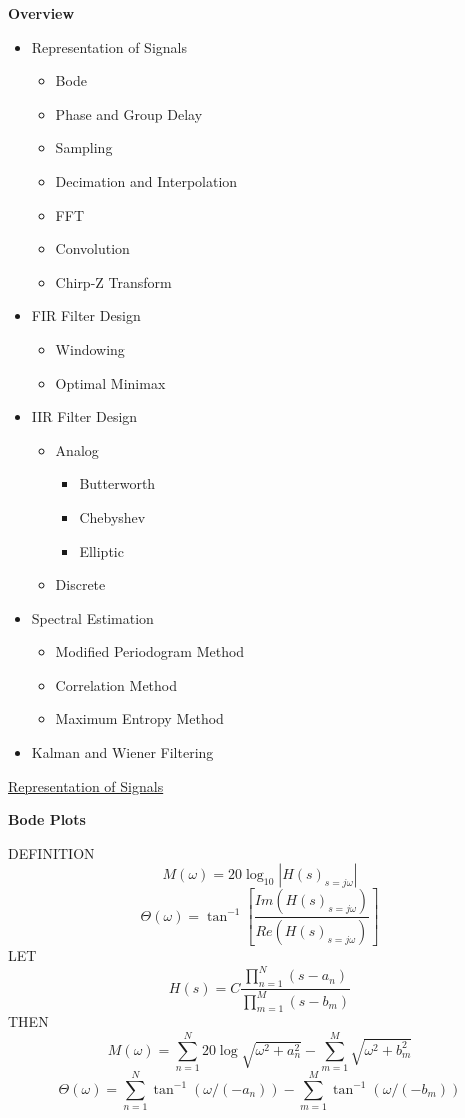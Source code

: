 \begin{slide}
{}
\begin{center}
{\bf Overview}
\end{center}
{\tiny
\begin{itemize}
\item Representation of Signals
   \begin{itemize}
   \item Bode
   \item Phase and Group Delay
   \item Sampling
   \item Decimation and Interpolation
   \item FFT
   \item Convolution
   \item Chirp-Z Transform
   \end{itemize}
\item FIR Filter Design
   \begin{itemize}
   \item Windowing
   \item Optimal Minimax
   \end{itemize}
\item IIR Filter Design
   \begin{itemize}
   \item Analog
      \begin{itemize}
      \item Butterworth
      \item Chebyshev
      \item Elliptic
      \end{itemize}
   \item Discrete
   \end{itemize}
\item Spectral Estimation
   \begin{itemize}
   \item Modified Periodogram Method
   \item Correlation Method
   \item Maximum Entropy Method
   \end{itemize}
\item Kalman and Wiener Filtering
\end{itemize}
}
\end{slide}
\begin{slide}
{}
{\tiny\underline{Representation of Signals}}
\begin{center}
{\bf Bode Plots}
\end{center}
\vfill
\vbox{
{\tiny
DEFINITION
%
$$
M(\omega)=20\log_{10}|H(s)_{s=j\omega}|
$$
%
\vfil
%
$$
\Theta(\omega)=\tan^{-1}[\frac{Im(H(s)_{s=j\omega})}{Re(H(s)_{s=j\omega})}]
$$
%
\vfil\vfil
LET
%
$$
H(s)=C\frac{\prod_{n=1}^{N}(s-a_n)}{\prod_{m=1}^{M}(s-b_m)}
$$
%
\vfil\vfil
THEN
%
$$
M(\omega)=\sum_{n=1}^{N}20\log\sqrt{\omega^2+a_n^2}-\sum_{m=1}^M\sqrt{\omega^2+b_m^2}
$$
%
\vfil
%
$$
\Theta(\omega)=\sum_{n=1}^{N}\tan^{-1}(\omega/(-a_n))-\sum_{m=1}^M\tan^{-1}(\omega/(-b_m))
$$
%
}}
\vfill
\end{slide}
